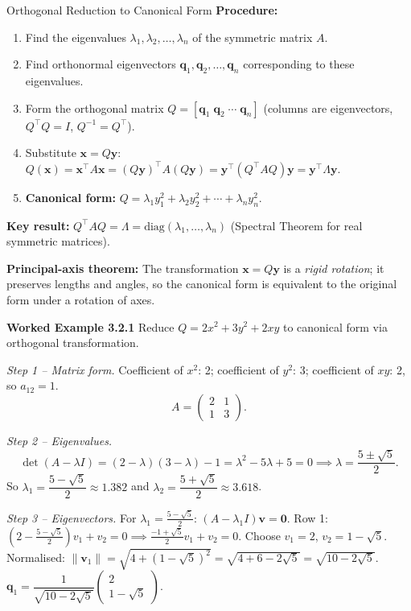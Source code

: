 \documentclass[12pt,a4paper]{article}
\begin{document}
\begin{infobox}{Orthogonal Reduction to Canonical Form}
\textbf{Procedure:}
\begin{enumerate}[leftmargin=1.5em]
  \item Find the eigenvalues $\lambda_1, \lambda_2, \ldots, \lambda_n$ of the symmetric matrix $A$.
  \item Find orthonormal eigenvectors $\mathbf{q}_1, \mathbf{q}_2, \ldots, \mathbf{q}_n$ corresponding to these eigenvalues.
  \item Form the orthogonal matrix $Q = [\mathbf{q}_1\; \mathbf{q}_2\;\cdots\; \mathbf{q}_n]$ (columns are eigenvectors, $Q^{\top}Q = I$, $Q^{-1}=Q^{\top}$).
  \item Substitute $\mathbf{x} = Q\mathbf{y}$: \quad
        $Q(\mathbf{x}) = \mathbf{x}^{\top}A\mathbf{x} = (Q\mathbf{y})^{\top}A(Q\mathbf{y}) = \mathbf{y}^{\top}(Q^{\top}AQ)\mathbf{y} = \mathbf{y}^{\top}\Lambda\mathbf{y}$.
  \item \textbf{Canonical form:} $Q = \lambda_1 y_1^{2} + \lambda_2 y_2^{2} + \cdots + \lambda_n y_n^{2}$.
\end{enumerate}

\textbf{Key result:} $Q^{\top}AQ = \Lambda = \mathrm{diag}(\lambda_1,\ldots,\lambda_n)$ (Spectral Theorem for real symmetric matrices).

\textbf{Principal-axis theorem:} The transformation $\mathbf{x} = Q\mathbf{y}$ is a \emph{rigid rotation}; it preserves lengths and angles, so the canonical form is equivalent to the original form under a rotation of axes.
\end{infobox}

\textbf{Worked Example 3.2.1} Reduce $Q = 2x^{2} + 3y^{2} + 2xy$ to canonical form via orthogonal transformation.

\textit{Step 1 -- Matrix form.}
Coefficient of $x^{2}$: 2; coefficient of $y^{2}$: 3; coefficient of $xy$: 2, so $a_{12}=1$.
\[
A = \begin{pmatrix} 2 & 1 \\ 1 & 3 \end{pmatrix}.
\]

\textit{Step 2 -- Eigenvalues.}
\[
\det(A - \lambda I) = (2-\lambda)(3-\lambda)-1 = \lambda^{2}-5\lambda+5=0
\implies \lambda = \frac{5 \pm \sqrt{5}}{2}.
\]
So $\lambda_1 = \dfrac{5-\sqrt{5}}{2} \approx 1.382$ and $\lambda_2 = \dfrac{5+\sqrt{5}}{2} \approx 3.618$.

\textit{Step 3 -- Eigenvectors.}
For $\lambda_1 = \frac{5-\sqrt{5}}{2}$: $(A-\lambda_1 I)\mathbf{v}=\mathbf{0}$.
Row 1: $\left(2 - \frac{5-\sqrt{5}}{2}\right)v_1 + v_2 = 0 \implies \frac{-1+\sqrt{5}}{2}v_1 + v_2 = 0$.
Choose $v_1 = 2$, $v_2 = 1-\sqrt{5}$.
Normalised: $\|\mathbf{v}_1\| = \sqrt{4+(1-\sqrt{5})^{2}} = \sqrt{4+6-2\sqrt{5}} = \sqrt{10-2\sqrt{5}}$.
$\mathbf{q}_1 = \dfrac{1}{\sqrt{10-2\sqrt{5}}}\begin{pmatrix}2\\1-\sqrt{5}\end{pmatrix}$.
\end{document}
